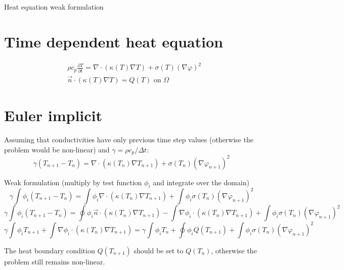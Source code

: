 \documentclass[12pt,a4paper]{article}
\numberwithin{figure}{section}
\numberwithin{table}{section}
\numberwithin{equation}{section}
\begin{document}
\begin{center}
	{\LARGE Heat equation weak formulation} \\
\end{center}

\section{Time dependent heat equation}

\begin{align}
&\rho c_p \frac{\partial T}{\partial t} = \nabla \cdot \left( \kappa(T) \nabla T \right) + \sigma(T) (\nabla \varphi)^2 \\
&\vec{n} \cdot \left( \kappa(T) \nabla T \right) = Q(T) \text{ on $\Omega$}
\end{align}



\section{Euler implicit}

Assuming that conductivities have only previous time step values (otherwise the problem would be non-linear) and $\gamma = \rho c_p / \Delta t$:
\begin{equation}
\gamma (T_{n+1} - T_n) = \nabla \cdot \left( \kappa(T_n) \nabla T_{n+1} \right) + \sigma(T_n) (\nabla \varphi_{n+1})^2 
\end{equation}

Weak formulation (multiply by test function $\phi_i$ and integrate over the domain)
$$\gamma \int \phi_i (T_{n+1} - T_n) = \int \phi_i \nabla \cdot \left( \kappa(T_n) \nabla T_{n+1} \right) + \int \phi_i \sigma(T_n) (\nabla \varphi_{n+1})^2 $$
$$\gamma \int \phi_i (T_{n+1} - T_n) = \oint \phi_i \vec{n} \cdot \left( \kappa(T_n) \nabla T_{n+1} \right) - \int \nabla \phi_i \cdot \left( \kappa(T_n) \nabla T_{n+1} \right) + \int \phi_i \sigma(T_n) (\nabla \varphi_{n+1})^2 $$
$$\gamma \int \phi_i T_{n+1} + \int \nabla \phi_i \cdot \left( \kappa(T_n) \nabla T_{n+1} \right) = \gamma \int \phi_i T_n + \oint \phi_i Q(T_{n+1})  + \int \phi_i \sigma(T_n) (\nabla \varphi_{n+1})^2 $$

The heat boundary condition $Q(T_{n+1})$ should be set to $Q(T_{n})$, otherwise the problem still remains non-linear.
\end{document}
